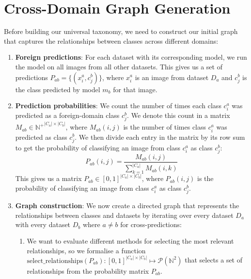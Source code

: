 \section{Cross-Domain Graph Generation} \label{sec:graph_construction}

Before building our universal taxonomy,
we need to construct our initial graph that captures the relationships between classes across different domains:

\begin{enumerate}
      \item \textbf{Foreign predictions}: For each dataset with its corresponding model,
            we run the model on all images from all other datasets.
            This gives us a set of predictions $P_{ab} = \{(x_i^a, c_j^b)\}$,
            where $x_i^a$ is an image from dataset $D_a$ and $c_j^b$ is the class
            predicted by model $m_b$ for that image.
      \item \textbf{Prediction probabilities}: We count the number of times each class $c_i^a$ was predicted
            as a foreign-domain class $c_j^b$.
            We denote this count in a matrix $M_{ab}\in {\mathbb{N}^+}^{|C_a| \times |C_b|}$,
            where $M_{ab}(i, j)$ is the number of times class $c_i^a$ was predicted
            as class $c_j^b$.
            We then divide each entry in the matrix by its row sum to get the
            probability of classifying an image from class $c_i^a$ as class $c_j^b$:
            \begin{equation*}
                  P_{ab}(i, j) = \frac{M_{ab}(i, j)}{\sum_{k=1}^{|C_a|} M_{ab}(i, k)}
            \end{equation*}
            This gives us a matrix $P_{ab}\in [0, 1]^{|C_a| \times |C_b|}$,
            where $P_{ab}(i, j)$ is the probability of classifying an image from class $c_i^a$
            as class $c_j^b$.
      \item \textbf{Graph construction}: We now create a directed graph that represents the relationships between classes and datasets
            by iterating over every dataset $D_a$ with every dataset $D_b$ where $a \neq b$ for cross-predictions:
            \begin{enumerate}
                  \item We want to evaluate different methods for selecting the most relevant relationships,
                        so we formalise a function $\text{select\_relationships}(P_{ab}): [0, 1]^{|C_a| \times |C_b|} \mapsto \mathcal{P}(\mathbb{N}^2)$
                        that selects a set of relationships from the probability matrix $P_{ab}$.

\end{enumerate}
\end{enumerate}
